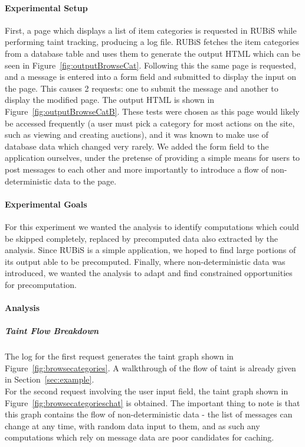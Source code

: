 \documentclass[msc,oneside]{ubcthesis}
\begin{document}
\paragraph{Experimental Setup}
\label{sec:rubisprecompsetup}
First, a page which displays a list of item categories is requested in RUBiS while performing taint tracking, producing a log file. RUBiS fetches the item categories from a database table and uses them to generate the output HTML which can be seen in Figure~\ref{fig:outputBrowseCat}. Following this the same page is requested, and a message is entered into a form field and submitted to display the input on the page. This causes 2 requests: one to submit the message and another to display the modified page. The output HTML is shown in Figure~\ref{fig:outputBrowseCatB}. These tests were chosen as this page would likely be accessed frequently (a user must pick a category for most actions on the site, such as viewing and creating auctions), and it was known to make use of database data which changed very rarely. We added the form field to the application ourselves, under the pretense of providing a simple means for users to post messages to each other and more importantly to introduce a flow of non-deterministic data to the page.

\paragraph{Experimental Goals}
For this experiment we wanted the analysis to identify computations which could be skipped completely, replaced by precomputed data also extracted by the analysis. Since RUBiS is a simple application, we hoped to find large portions of its output able to be precomputed. Finally, where non-deterministic data was introduced, we wanted the analysis to adapt and find constrained opportunities for precomputation.

\paragraph{Analysis}
\subparagraph{Taint Flow Breakdown}
\label{sec:rubisprecompflow}
The log for the first request generates the taint graph shown in Figure~\ref{fig:browsecategories}. A walkthrough of the flow of taint is already given in Section~\ref{sec:example}.\\

For the second request involving the user input field, the taint graph shown in Figure~\ref{fig:browsecategorieschat} is obtained. The important thing to note is that this graph contains the flow of non-deterministic data - the list of messages can change at any time, with random data input to them, and as such any computations which rely on message data are poor candidates for caching.\\
\end{document}
